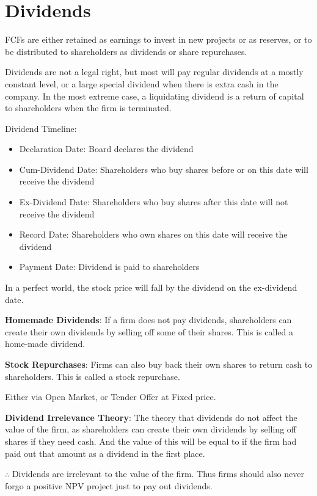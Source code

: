 \section{Dividends}
FCFs are either retained as earnings to invest in new projects or as reserves, or to be distributed to shareholders as dividends or share repurchases.

Dividends are not a legal right, but most will pay regular dividends at a mostly constant level, or a large special dividend when there is extra cash in the company. In the most extreme case, a liquidating dividend is a return of capital to shareholders when the firm is terminated.

Dividend Timeline:
\begin{itemize}
    \item Declaration Date: Board declares the dividend
    \item Cum-Dividend Date: Shareholders who buy shares before or on this date will receive the dividend
    \item Ex-Dividend Date: Shareholders who buy shares after this date will not receive the dividend
    \item Record Date: Shareholders who own shares on this date will receive the dividend
    \item Payment Date: Dividend is paid to shareholders
\end{itemize}

In a perfect world, the stock price will fall by the dividend on the ex-dividend date.

\textbf{Homemade Dividends}:
If a firm does not pay dividends, shareholders can create their own dividends by selling off some of their shares. This is called a home-made dividend.

\textbf{Stock Repurchases}:
Firms can also buy back their own shares to return cash to shareholders. This is called a stock repurchase.

Either via Open Market, or Tender Offer at Fixed price.

\textbf{Dividend Irrelevance Theory}:
The theory that dividends do not affect the value of the firm, as shareholders can create their own dividends by selling off shares if they need cash. And the value of this will be equal to if the firm had paid out that amount as a dividend in the first place.

$\therefore$ Dividends are irrelevant to the value of the firm.
Thus firms should also never forgo a positive NPV project just to pay out dividends.

